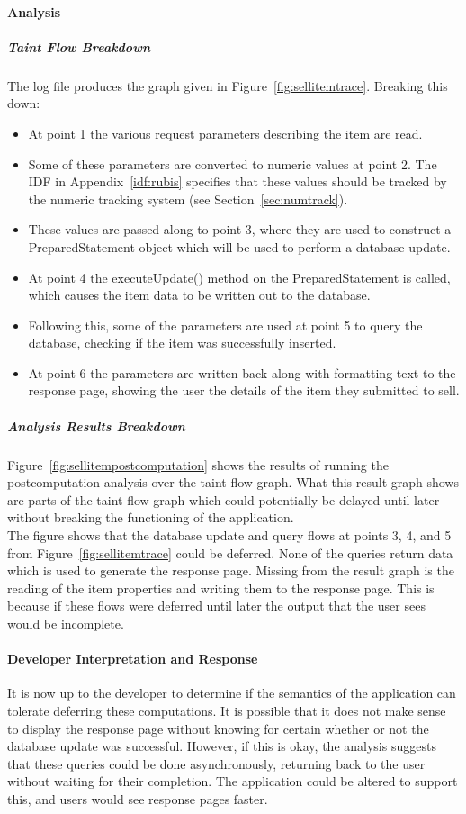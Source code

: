 \documentclass[msc,oneside]{ubcthesis}
\begin{document}
\paragraph{Analysis}
\subparagraph{Taint Flow Breakdown}
The log file produces the graph given in Figure~\ref{fig:sellitemtrace}. Breaking this down:
\begin{itemize}
\item At point 1 the various request parameters describing the item are read.
\item Some of these parameters are converted to numeric values at point 2. The IDF in Appendix~\ref{idf:rubis} specifies that these values should be tracked by the numeric tracking system (see Section~\ref{sec:numtrack}).
\item These values are passed along to point 3, where they are used to construct a PreparedStatement object which will be used to perform a database update.
\item At point 4 the executeUpdate() method on the PreparedStatement is called, which causes the item data to be written out to the database.
\item Following this, some of the parameters are used at point 5 to query the database, checking if the item was successfully inserted.
\item At point 6 the parameters are written back along with formatting text to the response page, showing the user the details of the item they submitted to sell.
\end{itemize}

\subparagraph{Analysis Results Breakdown}
Figure~\ref{fig:sellitempostcomputation} shows the results of running the postcomputation analysis over the taint flow graph. What this result graph shows are parts of the taint flow graph which could potentially be delayed until later without breaking the functioning of the application.\\

The figure shows that the database update and query flows at points 3, 4, and 5 from Figure~\ref{fig:sellitemtrace} could be deferred. None of the queries return data which is used to generate the response page. Missing from the result graph is the reading of the item properties and writing them to the response page. This is because if these flows were deferred until later the output that the user sees would be incomplete.

\paragraph{Developer Interpretation and Response}
It is now up to the developer to determine if the semantics of the application can tolerate deferring these computations. It is possible that it does not make sense to display the response page without knowing for certain whether or not the database update was successful. However, if this is okay, the analysis suggests that these queries could be done asynchronously, returning back to the user without waiting for their completion. The application could be altered to support this, and users would see response pages faster. \\
\end{document}
